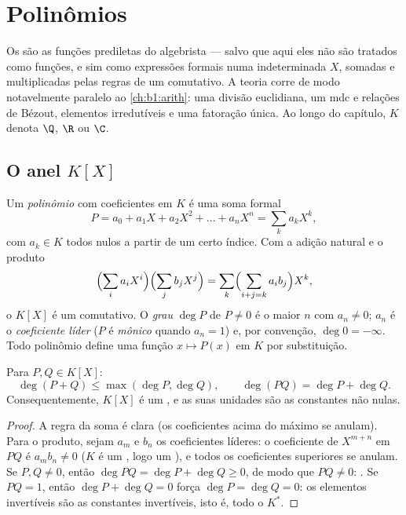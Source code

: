 \chapter{Polinômios}\label{ch:b1:poly}

Os  são as funções prediletas do algebrista --- salvo que
aqui eles não são tratados como funções, e sim como expressões formais
numa indeterminada $X$, somadas e multiplicadas pelas regras de um
 comutativo. A teoria corre de modo notavelmente paralelo ao
\cref{ch:b1:arith}: uma divisão euclidiana, um mdc e relações de Bézout,
elementos irredutíveis e uma fatoração única. Ao longo do capítulo, $K$
denota $\Q$, $\R$ ou $\C$.

\section{O anel $K[X]$}

\begin{definition}\label{def:b1:poly:def}
Um \emph{polinômio} com coeficientes em $K$ é uma
soma formal
\[
P = a_0 + a_1 X + a_2 X^2 + \dots + a_n X^n
= \sum_{k} a_k X^k,
\]
com $a_k \in K$ todos nulos a partir de um certo índice. Com a adição
natural e o produto
\[
\Bigl(\sum_i a_i X^i\Bigr)\Bigl(\sum_j b_j X^j\Bigr)
= \sum_k \Bigl(\sum_{i+j=k} a_i b_j\Bigr) X^k,
\]
o  $K[X]$ é um  comutativo. O \emph{grau} $\deg P$ de
$P \neq 0$ é o maior $n$ com $a_n \neq 0$; $a_n$ é o
\emph{coeficiente líder} ($P$ é \emph{mônico} quando $a_n = 1$) e, por convenção, $\deg 0 = -\infty$.
Todo polinômio define uma função $x \mapsto P(x)$ em $K$ por
substituição.
\end{definition}

\begin{proposition}\label{prop:b1:poly:degree}
Para $P, Q \in K[X]$:
\[
\deg(P + Q) \leq \max(\deg P, \deg Q),
\qquad
\deg(PQ) = \deg P + \deg Q .
\]
Consequentemente, $K[X]$ é um , e as suas unidades
são as constantes não nulas.
\end{proposition}

\begin{proof}
A regra da soma é clara (os coeficientes acima do máximo se anulam).
Para o produto, sejam $a_m$ e $b_n$ os coeficientes líderes: o
coeficiente de $X^{m+n}$ em $PQ$ é $a_m b_n \neq 0$ ($K$ é um
, logo um ), e todos os coeficientes
superiores se anulam. Se $P, Q \neq 0$, então $\deg PQ = \deg P + \deg Q \geq 0$, de modo que $PQ \neq
0$: . Se $PQ = 1$,
então $\deg P + \deg Q = 0$ força $\deg P = \deg Q = 0$: os elementos
invertíveis são as constantes invertíveis, isto é, todo o $K^*$.
\end{proof}


